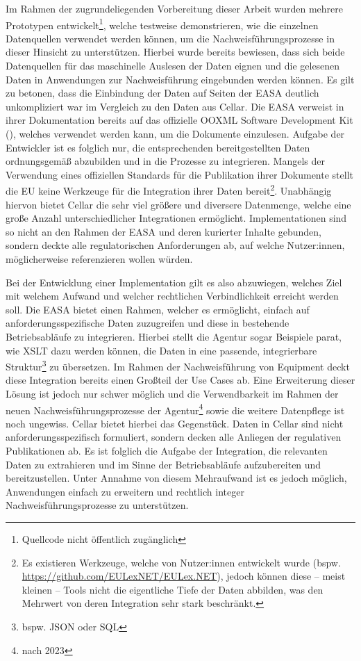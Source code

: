     Im Rahmen der zugrundeliegenden Vorbereitung dieser Arbeit wurden mehrere Prototypen entwickelt\footnote{Quellcode nicht öffentlich zugänglich}, welche testweise demonstrieren, wie die einzelnen Datenquellen verwendet werden können, um die Nachweisführungsprozesse in dieser Hinsicht zu unterstützen.
    Hierbei wurde bereits bewiesen, dass sich beide Datenquellen für das maschinelle Auslesen der Daten eignen und die gelesenen Daten in Anwendungen zur Nachweisführung eingebunden werden können.
    Es gilt zu betonen, dass die Einbindung der Daten auf Seiten der \ac{EASA} deutlich unkompliziert war im Vergleich zu den Daten aus Cellar.
    Die \ac{EASA} verweist in ihrer Dokumentation bereits auf das offizielle \ac{OOXML} Software Development Kit (), welches verwendet werden kann, um die Dokumente einzulesen.
    Aufgabe der Entwickler ist es folglich nur, die entsprechenden bereitgestellten Daten ordnungsgemäß abzubilden und in die Prozesse zu integrieren.
    Mangels der Verwendung eines offiziellen Standards für die Publikation ihrer Dokumente stellt die \ac{EU} keine Werkzeuge für die Integration ihrer Daten bereit\footnote{Es existieren Werkzeuge, welche von Nutzer:innen entwickelt wurde (bspw. \href{https://github.com/EULexNET/EULex.NET}{https://github.com/EULexNET/EULex.NET}), jedoch können diese -- meist kleinen -- Tools nicht die eigentliche Tiefe der Daten abbilden, was den Mehrwert von deren Integration sehr stark beschränkt.}.
    Unabhängig hiervon bietet Cellar die sehr viel größere und diversere Datenmenge, welche eine große Anzahl unterschiedlicher Integrationen ermöglicht.
    Implementationen sind so nicht an den Rahmen der \ac{EASA} und deren kurierter Inhalte gebunden, sondern deckte alle regulatorischen Anforderungen ab, auf welche Nutzer:innen, möglicherweise referenzieren wollen würden.
    
    \medskip
    Bei der Entwicklung einer Implementation gilt es also abzuwiegen, welches Ziel mit welchem Aufwand und welcher rechtlichen Verbindlichkeit erreicht werden soll.
    Die \ac{EASA} bietet einen Rahmen, welcher es ermöglicht, einfach auf anforderungsspezifische Daten zuzugreifen und diese in bestehende Betriebsabläufe zu integrieren.
    Hierbei stellt die Agentur sogar Beispiele parat, wie \ac{XSLT} dazu werden können, die Daten in eine passende, integrierbare Struktur\footnote{bspw. JSON oder SQL} zu übersetzen.
    Im Rahmen der Nachweisführung von \atmans{} Equipment deckt diese Integration bereits einen Großteil der Use Cases ab.
    Eine Erweiterung dieser Lösung ist jedoch nur schwer möglich und die Verwendbarkeit im Rahmen der neuen Nachweisführungsprozesse der Agentur\footnote{nach 2023} sowie die weitere Datenpflege ist noch ungewiss.
    Cellar bietet hierbei das Gegenstück. Daten in Cellar sind nicht anforderungsspezifisch formuliert, sondern decken alle Anliegen der regulativen Publikationen ab.
    Es ist folglich die Aufgabe der Integration, die relevanten Daten zu extrahieren und im Sinne der Betriebsabläufe aufzubereiten und bereitzustellen.
    Unter Annahme von diesem Mehraufwand ist es jedoch möglich, Anwendungen einfach zu erweitern und rechtlich integer Nachweisführungsprozesse zu unterstützen.

